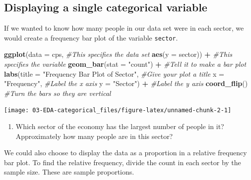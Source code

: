 \documentclass[
]{report}
\newenvironment{Shaded}{\begin{snugshade}}{\end{snugshade}}
\newcommand{\CommentTok}[1]{\textcolor[rgb]{0.56,0.35,0.01}{\textit{#1}}}
\newcommand{\DataTypeTok}[1]{\textcolor[rgb]{0.13,0.29,0.53}{#1}}
\newcommand{\KeywordTok}[1]{\textcolor[rgb]{0.13,0.29,0.53}{\textbf{#1}}}
\newcommand{\NormalTok}[1]{#1}
\newcommand{\OperatorTok}[1]{\textcolor[rgb]{0.81,0.36,0.00}{\textbf{#1}}}
\newcommand{\StringTok}[1]{\textcolor[rgb]{0.31,0.60,0.02}{#1}}
\providecommand{\tightlist}{%
  \setlength{\itemsep}{0pt}\setlength{\parskip}{0pt}}
\begin{document}
\hypertarget{displaying-a-single-categorical-variable}{%
\subsection{Displaying a single categorical variable}\label{displaying-a-single-categorical-variable}}

If we wanted to know how many people in our data set were in each sector, we would create a frequency bar plot of the variable \texttt{sector}.

\begin{Shaded}
\begin{Highlighting}[]
\KeywordTok{ggplot}\NormalTok{(}\DataTypeTok{data =}\NormalTok{ cps,   }\CommentTok{\#This specifies the data set}
       \KeywordTok{aes}\NormalTok{(}\DataTypeTok{y =}\NormalTok{ sector)) }\OperatorTok{+}\StringTok{   }\CommentTok{\#This specifies the variable}
\StringTok{  }\KeywordTok{geom\_bar}\NormalTok{(}\DataTypeTok{stat =} \StringTok{"count"}\NormalTok{) }\OperatorTok{+}\StringTok{  }\CommentTok{\#Tell it to make a bar plot}
\StringTok{  }\KeywordTok{labs}\NormalTok{(}\DataTypeTok{title =} \StringTok{"Frequency Bar Plot of Sector"}\NormalTok{,  }\CommentTok{\#Give your plot a title}
       \DataTypeTok{x =} \StringTok{"Frequency"}\NormalTok{,   }\CommentTok{\#Label the x axis}
       \DataTypeTok{y =} \StringTok{"Sector"}\NormalTok{)  }\OperatorTok{+}\StringTok{ }\CommentTok{\#Label the y axis}
\StringTok{  }\KeywordTok{coord\_flip}\NormalTok{()  }\CommentTok{\#Turn the bars so they are vertical}
\end{Highlighting}
\end{Shaded}

\begin{center}\texttt{[image: 03-EDA-categorical\_files/figure-latex/unnamed-chunk-2-1]} \end{center}

\begin{enumerate}
\def\labelenumi{\arabic{enumi}.}
\setcounter{enumi}{3}
\tightlist
\item
  Which sector of the economy has the largest number of people in it? Approximately how many people are in this sector?
\end{enumerate}

\vspace{0.3in}

We could also choose to display the data as a proportion in a relative frequency bar plot. To find the relative frequency, divide the count in each sector by the sample size. These are sample proportions.
\end{document}
